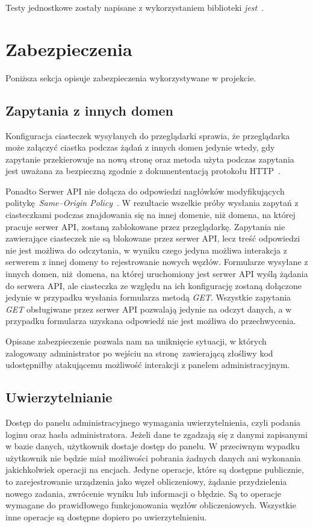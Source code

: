 \documentclass[a4paper,11pt,twoside]{report}
\theoremstyle{definition}
\begin{document}
Testy jednostkowe zostały napisane z wykorzystaniem biblioteki \textit{jest}~\cite{jest}.


\section{Zabezpieczenia}

Poniższa sekcja opisuje zabezpieczenia wykorzystywane w projekcie.

\subsection{Zapytania z innych domen}

Konfiguracja ciasteczek wysyłanych do przeglądarki sprawia, że przeglądarka może załączyć ciastka podczas żądań z innych domen jedynie wtedy, gdy zapytanie przekierowuje na nową stronę oraz metoda użyta podczas zapytania jest uważana za bezpieczną zgodnie z dokumententacją protokołu HTTP~\cite{rfc-7231}.

Ponadto Serwer API nie dołącza do odpowiedzi nagłówków modyfikujących politykę \textit{Same--Origin Policy}~\cite{same-origin-policy}. W rezultacie wszelkie próby wysłania zapytań z ciasteczkami podczas znajdowania się na innej domenie, niż domena, na której pracuje serwer API, zostaną zablokowane przez przeglądarkę. 
Zapytania nie zawierające ciasteczek nie są blokowane przez serwer API, lecz treść odpowiedzi nie jest możliwa do odczytania, w wyniku czego jedyna możliwa interakcja z serwerem z innej domeny to rejestrowanie nowych węzłów.
Formularze wysyłane z innych domen, niż domena, na której uruchomiony jest serwer API wyślą żądania do serwera API, ale ciasteczka ze względu na ich konfigurację zostaną dołączone jedynie w przypadku wysłania formularza metodą \textit{GET}.
Wszystkie zapytania \textit{GET} obsługiwane przez serwer API pozwalają jedynie na odczyt danych, a w przypadku formularza uzyskana odpowiedź nie jest możliwa do przechwycenia.

Opisane zabezpieczenie pozwala nam na uniknięcie sytuacji, w których zalogowany administrator po wejściu na stronę zawierającą złośliwy kod udostępniłby atakującemu możliwość interakcji z panelem administracyjnym.

\subsection{Uwierzytelnianie} 

Dostęp do panelu administracyjnego wymagania uwierzytelnienia, czyli podania loginu oraz hasła administratora. Jeżeli dane te zgadzają się z danymi zapisanymi w bazie danych, użytkownik dostaje dostęp do panelu.
W przeciwnym wypadku użytkownik nie będzie miał możliwości pobrania żadnych danych ani wykonania jakichkolwiek operacji na encjach.
Jedyne operacje, które są dostępne publicznie, to zarejestrowanie urządzenia jako węzeł obliczeniowy, żądanie przydzielenia nowego zadania, zwrócenie wyniku lub informacji o błędzie. Są to operacje wymagane do prawidłowego funkcjonowania węzłów obliczeniowych. Wszystkie inne operacje są dostępne dopiero po uwierzytelnieniu.
\end{document}
